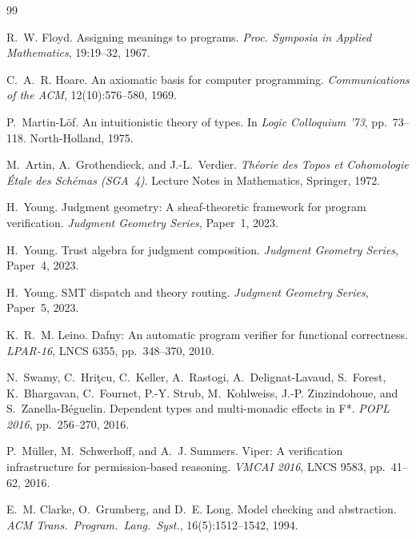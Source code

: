 \documentclass[11pt]{article}
\begin{document}
\begin{thebibliography}{99}

R.~W. Floyd.
\newblock Assigning meanings to programs.
\newblock \emph{Proc. Symposia in Applied Mathematics}, 19:19--32, 1967.

C.~A.~R. Hoare.
\newblock An axiomatic basis for computer programming.
\newblock \emph{Communications of the ACM}, 12(10):576--580, 1969.

P.~Martin-L\"of.
\newblock An intuitionistic theory of types.
\newblock In \emph{Logic Colloquium '73}, pp.\ 73--118. North-Holland, 1975.

M.~Artin, A.~Grothendieck, and J.-L.~Verdier.
\newblock \emph{Th\'eorie des Topos et Cohomologie \'Etale des Sch\'emas
  (SGA~4)}.
\newblock Lecture Notes in Mathematics, Springer, 1972.

H.~Young.
\newblock Judgment geometry: A sheaf-theoretic framework for program
  verification.
\newblock \emph{Judgment Geometry Series}, Paper~1, 2023.

H.~Young.
\newblock Trust algebra for judgment composition.
\newblock \emph{Judgment Geometry Series}, Paper~4, 2023.

H.~Young.
\newblock SMT dispatch and theory routing.
\newblock \emph{Judgment Geometry Series}, Paper~5, 2023.

K.~R.~M. Leino.
\newblock Dafny: An automatic program verifier for functional correctness.
\newblock \emph{LPAR-16}, LNCS 6355, pp.\ 348--370, 2010.

N.~Swamy, C.~Hri\c{t}cu, C.~Keller, A.~Rastogi, A.~Delignat-Lavaud,
  S.~Forest, K.~Bhargavan, C.~Fournet, P.-Y. Strub, M.~Kohlweiss, J.-P.
  Zinzindohoue, and S.~Zanella-B{\'e}guelin.
\newblock Dependent types and multi-monadic effects in F*.
\newblock \emph{POPL 2016}, pp.\ 256--270, 2016.

P.~M\"uller, M.~Schwerhoff, and A.~J. Summers.
\newblock Viper: A verification infrastructure for permission-based reasoning.
\newblock \emph{VMCAI 2016}, LNCS 9583, pp.\ 41--62, 2016.

E.~M. Clarke, O.~Grumberg, and D.~E. Long.
\newblock Model checking and abstraction.
\newblock \emph{ACM Trans.\ Program.\ Lang.\ Syst.}, 16(5):1512--1542, 1994.


\end{thebibliography}
\end{document}
